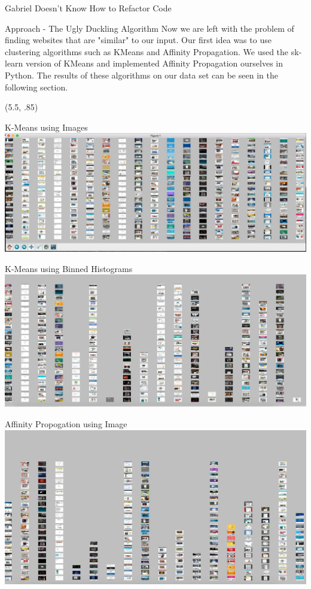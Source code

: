 \documentclass{beamer}
\begin{document}
\begin{frame}{\centerline{\Huge Gabriel Doesn't Know How to Refactor Code}}
\begin{textblock}{5}
\begin{block}{Approach - The Ugly Duckling Algorithm}
Now we are left with the problem of finding websites that are "similar" to our input. Our first idea was to use
clustering algorithms such as KMeans and Affinity Propagation. We used the sk-learn version of KMeans and implemented
Affinity Propagation ourselves in Python. The results of these algorithms on our data set can be seen in the following
section.
\end{block}


\end{textblock}

\begin{textblock}{5}(5.5, .85)

\begin{block}{K-Means using Images}
\includegraphics[scale=.5]{imgkmeans.png}
\end{block}
\begin{block}{ K-Means using Binned Histograms}
\includegraphics[scale=.5]{binKmeans.jpg}
\end{block}
\begin{block}{Affinity Propogation using Image}
\includegraphics[scale=.5]{affPropImg.jpg}

\end{block}
\end{textblock}
\end{frame}
\end{document}
